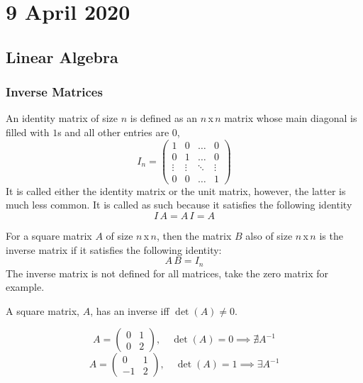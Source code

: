 \documentclass[diffeq.tex]{subfiles}
\begin{document}
\chapter{9 April 2020}
    \section{Linear Algebra}
    \subsection{Inverse Matrices}
    \begin{definition}
        An identity matrix of size $n$ is defined as an $n$\,x\,$n$ matrix whose main diagonal is filled with $1$s and all other entries are $0$,
        \begin{equation}
            I_{n} = \begin{pmatrix}
                1 & 0 & \dots & 0\\
                0 & 1 & \dots & 0\\
                \vdots & \vdots & \ddots & \vdots \\
                0 & 0 & \dots & 1 
            \end{pmatrix}
        \end{equation}
        It is called either the identity matrix or the unit matrix, however, the latter is much less common. It is called as such because it satisfies the following identity
        \begin{equation}
            I\,A = A\,I = A
        \end{equation}
    \end{definition}
    \begin{definition}
        For a square matrix $A$ of size $n$\,x\,$n$, then the matrix $B$ also of size $n$\,x\,$n$ is the inverse matrix if it satisfies the following identity:
        \begin{equation}
            A\,B = I_{n}
        \end{equation}
        The inverse matrix is not defined for all matrices, take the zero matrix for example.
    \end{definition}
    \begin{btheorem}
        A square matrix, $A$, has an inverse iff $\det(A) \neq 0$.
    \end{btheorem}
    \begin{example}
        \begin{equation}
            A = \begin{pmatrix}
                0 & 1\\
                0 & 2
            \end{pmatrix},\quad \det(A) = 0 \implies \nexists A^{-1}
        \end{equation}
        \begin{equation}
            A = \begin{pmatrix}
                0 & 1\\
                -1 & 2
            \end{pmatrix},\quad \det(A) = 1 \implies \exists A^{-1}
        \end{equation}
    \end{example}
\end{document}
